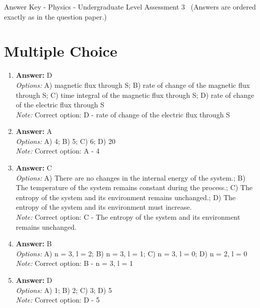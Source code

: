 \documentclass[12pt]{article}
\begin{document}
\begin{center}
Answer Key - Physics - Undergraduate Level Assessment 3 \
\small (Answers are ordered exactly as in the question paper.)
\end{center}

\section*{Multiple Choice}
\begin{enumerate}[label=\arabic*.]
\item \textbf{Answer:} D
\\ \textit{Options:} A) magnetic flux through S; B) rate of change of the magnetic flux through S; C) time integral of the magnetic flux through S; D) rate of change of the electric flux through S
\\ \textit{Note:} Correct option: D - rate of change of the electric flux through S
\item \textbf{Answer:} A
\\ \textit{Options:} A) 4; B) 5; C) 6; D) 20
\\ \textit{Note:} Correct option: A - 4
\item \textbf{Answer:} C
\\ \textit{Options:} A) There are no changes in the internal energy of the system.; B) The temperature of the system remains constant during the process.; C) The entropy of the system and its environment remains unchanged.; D) The entropy of the system and its environment must increase.
\\ \textit{Note:} Correct option: C - The entropy of the system and its environment remains unchanged.
\item \textbf{Answer:} B
\\ \textit{Options:} A) n = 3, l = 2; B) n = 3, l = 1; C) n = 3, l = 0; D) n = 2, l = 0
\\ \textit{Note:} Correct option: B - n = 3, l = 1
\item \textbf{Answer:} D
\\ \textit{Options:} A) 1; B) 2; C) 3; D) 5
\\ \textit{Note:} Correct option: D - 5
\end{enumerate}
\end{document}

